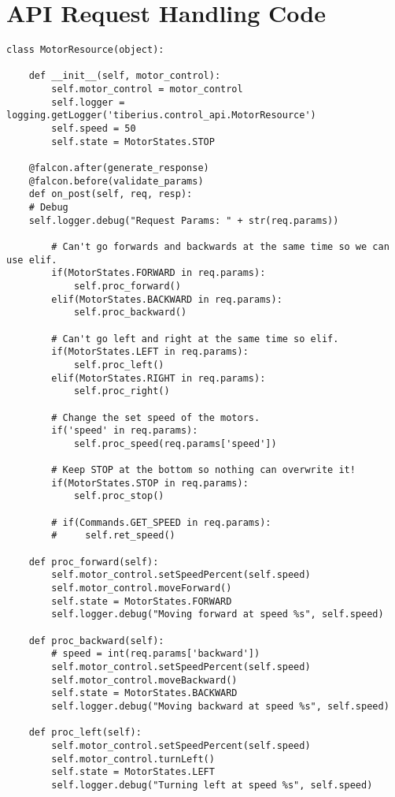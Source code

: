 \chapter{API Request Handling Code}
\label{app:on_post_code}

\begin{lstlisting}[style=custompython]
class MotorResource(object):

    def __init__(self, motor_control):
        self.motor_control = motor_control
        self.logger = logging.getLogger('tiberius.control_api.MotorResource')
        self.speed = 50
        self.state = MotorStates.STOP

    @falcon.after(generate_response)
    @falcon.before(validate_params)
    def on_post(self, req, resp):
	# Debug
	self.logger.debug("Request Params: " + str(req.params))

        # Can't go forwards and backwards at the same time so we can use elif.
        if(MotorStates.FORWARD in req.params):
            self.proc_forward()
        elif(MotorStates.BACKWARD in req.params):
            self.proc_backward()

        # Can't go left and right at the same time so elif.
        if(MotorStates.LEFT in req.params):
            self.proc_left()
        elif(MotorStates.RIGHT in req.params):
            self.proc_right()

        # Change the set speed of the motors.
        if('speed' in req.params):
            self.proc_speed(req.params['speed'])

        # Keep STOP at the bottom so nothing can overwrite it!
        if(MotorStates.STOP in req.params):
            self.proc_stop()

        # if(Commands.GET_SPEED in req.params):
        #     self.ret_speed()

    def proc_forward(self):
        self.motor_control.setSpeedPercent(self.speed)
        self.motor_control.moveForward()
        self.state = MotorStates.FORWARD
        self.logger.debug("Moving forward at speed %s", self.speed)

    def proc_backward(self):
        # speed = int(req.params['backward'])
        self.motor_control.setSpeedPercent(self.speed)
        self.motor_control.moveBackward()
        self.state = MotorStates.BACKWARD
        self.logger.debug("Moving backward at speed %s", self.speed)

    def proc_left(self):
        self.motor_control.setSpeedPercent(self.speed)
        self.motor_control.turnLeft()
        self.state = MotorStates.LEFT
        self.logger.debug("Turning left at speed %s", self.speed)


\end{lstlisting}
